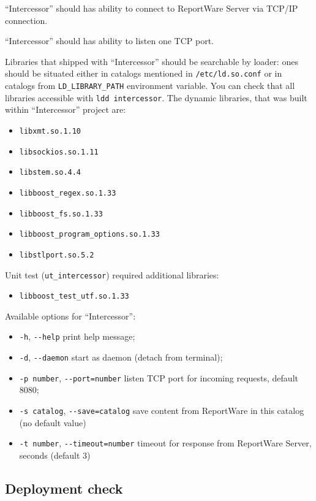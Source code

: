 \documentclass[a4paper,twoside]{article}
\newcommand{\Inter}{{\fontseries{b}\selectfont ``Intercessor''}}
\begin{document}
\Inter{} should has ability to connect to ReportWare Server via TCP/IP connection.

\Inter{} should has ability to listen one TCP port.

Libraries that shipped with \Inter{} should be searchable by loader:
ones should be situated either in catalogs mentioned in \verb|/etc/ld.so.conf|
or in catalogs from \verb|LD_LIBRARY_PATH| environment variable. You can check
that all libraries accessible with \verb|ldd intercessor|. The dynamic libraries,
that was built within \Inter{} project are:
\begin{itemize}
  \item \verb|libxmt.so.1.10|
  \item \verb|libsockios.so.1.11|
  \item \verb|libstem.so.4.4|
  \item \verb|libboost_regex.so.1.33|
  \item \verb|libboost_fs.so.1.33|
  \item \verb|libboost_program_options.so.1.33|
  \item \verb|libstlport.so.5.2|
\end{itemize}

Unit test (\verb|ut_intercessor|) required additional libraries:
\begin{itemize}
  \item \verb|libboost_test_utf.so.1.33|
\end{itemize}

Available options for \Inter{}:
\begin{itemize}
  \item \verb|-h|, \verb|--help| print help message;
  \item \verb|-d|, \verb|--daemon| start as daemon (detach from terminal);
  \item \verb|-p number|, \verb|--port=number| listen TCP port for incoming requests, default 8080;
  \item \verb|-s catalog|, \verb|--save=catalog| save content from ReportWare in this catalog (no default value)
  \item \verb|-t number|, \verb|--timeout=number| timeout for response from ReportWare Server, seconds (default 3)
\end{itemize}

\subsection{Deployment check}
\end{document}
